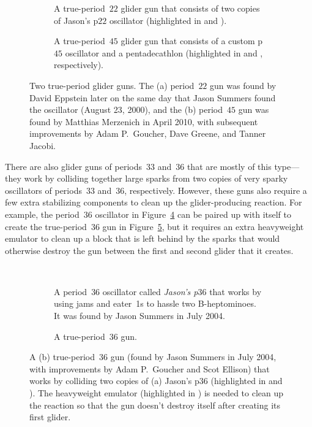 \begin{figure}[!htb]
	\centering
	\begin{subfigure}{0.50\textwidth}
		\centering
		\caption{A true-period~$22$ glider gun that consists of two copies of Jason's p$22$ oscillator (highlighted in  and ).}\label{fig:p22_glider_gun}
	\end{subfigure} \hfill \begin{subfigure}{0.46\textwidth}
		\centering
		\caption{A true-period~$45$ glider gun that consists of a custom p$45$ oscillator and a pentadecathlon (highlighted in  and , respectively).}\label{fig:p45_gun}
	\end{subfigure}
	\caption{Two true-period glider guns. The (a) period~$22$ gun was found by David Eppstein later on the same day that Jason Summers found the oscillator (August 23, 2000), and the (b) period~$45$ gun was found by Matthias Merzenich in April 2010, with subsequent improvements by  Adam P.~Goucher, Dave Greene, and Tanner Jacobi.}\label{fig:p22_45_guns}
\end{figure}

There are also glider guns of periods~$33$ and~$36$ that are mostly of this type---they work by colliding together large sparks from two copies of very sparky oscillators of periods~$33$ and~$36$, respectively. However, these guns also require a few extra stabilizing components to clean up the glider-producing reaction. For example, the period~$36$ oscillator in Figure~\ref{fig:jasons_p36} can be paired up with itself to create the true-period~$36$ gun in Figure~\ref{fig:p36_gun}, but it requires an extra heavyweight emulator to clean up a block that is left behind by the sparks that would otherwise destroy the gun between the first and second glider that it creates.

\begin{figure}[!htb]
	\centering
	${}$ \ \begin{subfigure}{0.53\textwidth}
		\centering\vspace*{0.6cm}
		\caption{A period~$36$ oscillator called \emph{Jason's p$36$} that works by using jams and eater~1s to hassle two B-heptominoes. It was found by Jason Summers in July 2004.}\label{fig:jasons_p36}
	\end{subfigure} \hfill \begin{subfigure}{0.42\textwidth}
		\centering
		\caption{A true-period~$36$ gun.}\label{fig:p36_gun}
	\end{subfigure}
	\caption{A (b) true-period~$36$ gun (found by Jason Summers in July 2004, with improvements by Adam P.~Goucher and Scot Ellison) that works by colliding two copies of (a) Jason's p$36$ (highlighted in  and ). The heavyweight emulator (highlighted in ) is needed to clean up the reaction so that the gun doesn't destroy itself after creating its first glider.}\label{fig:p36_gun_both}
\end{figure}

